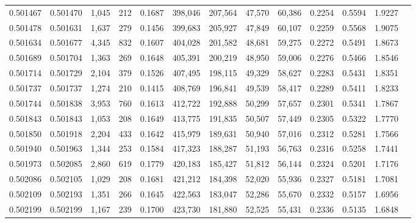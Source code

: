 \begin{tabular}{rrrrrrrrrrrrr}
0.501467 & 0.501470 &  1,045 &   212 &                                     0.1687 & 398,046 & 207,564 &  47,570 &  60,386 & 0.2254 & 0.5594 & 1.9227 \\
0.501478 & 0.501631 &  1,637 &   279 &                                     0.1456 & 399,683 & 205,927 &  47,849 &  60,107 & 0.2259 & 0.5568 & 1.9075 \\
0.501634 & 0.501677 &  4,345 &   832 &                                     0.1607 & 404,028 & 201,582 &  48,681 &  59,275 & 0.2272 & 0.5491 & 1.8673 \\
0.501689 & 0.501704 &  1,363 &   269 &                                     0.1648 & 405,391 & 200,219 &  48,950 &  59,006 & 0.2276 & 0.5466 & 1.8546 \\
0.501714 & 0.501729 &  2,104 &   379 &                                     0.1526 & 407,495 & 198,115 &  49,329 &  58,627 & 0.2283 & 0.5431 & 1.8351 \\
0.501737 & 0.501737 &  1,274 &   210 &                                     0.1415 & 408,769 & 196,841 &  49,539 &  58,417 & 0.2289 & 0.5411 & 1.8233 \\
0.501744 & 0.501838 &  3,953 &   760 &                                     0.1613 & 412,722 & 192,888 &  50,299 &  57,657 & 0.2301 & 0.5341 & 1.7867 \\
0.501843 & 0.501843 &  1,053 &   208 &                                     0.1649 & 413,775 & 191,835 &  50,507 &  57,449 & 0.2305 & 0.5322 & 1.7770 \\
0.501850 & 0.501918 &  2,204 &   433 &                                     0.1642 & 415,979 & 189,631 &  50,940 &  57,016 & 0.2312 & 0.5281 & 1.7566 \\
0.501940 & 0.501963 &  1,344 &   253 &                                     0.1584 & 417,323 & 188,287 &  51,193 &  56,763 & 0.2316 & 0.5258 & 1.7441 \\
0.501973 & 0.502085 &  2,860 &   619 &                                     0.1779 & 420,183 & 185,427 &  51,812 &  56,144 & 0.2324 & 0.5201 & 1.7176 \\
0.502086 & 0.502105 &  1,029 &   208 &                                     0.1681 & 421,212 & 184,398 &  52,020 &  55,936 & 0.2327 & 0.5181 & 1.7081 \\
0.502109 & 0.502193 &  1,351 &   266 &                                     0.1645 & 422,563 & 183,047 &  52,286 &  55,670 & 0.2332 & 0.5157 & 1.6956 \\
0.502199 & 0.502199 &  1,167 &   239 &                                     0.1700 & 423,730 & 181,880 &  52,525 &  55,431 & 0.2336 & 0.5135 & 1.6848 \\

\end{tabular}
